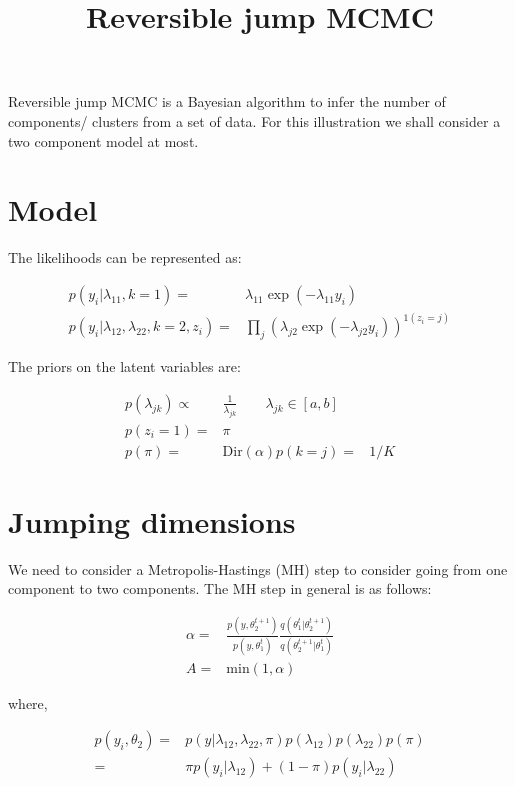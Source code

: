 \documentclass{article}
\title{Reversible jump MCMC}
\date{}
\begin{document}
\maketitle




Reversible jump MCMC is a Bayesian algorithm to infer the number of components/ clusters from a set of data. For this illustration we shall consider a two component model at most.

\section{Model}
The likelihoods can be represented as:

\begin{align}
p(y_i|\lambda_{11},k=1)=&\lambda_{11}\exp(-\lambda_{11}y_i)\\
p(y_i|\lambda_{12},\lambda_{22},k=2,z_i)=&\prod_j (\lambda_{j2}\exp(-\lambda_{j2}y_i))^{1(z_i=j)}
\end{align}


The priors on the latent variables are:


\begin{align}
p(\lambda_{jk})\propto & \frac{1}{\lambda_{jk}}\qquad \lambda_{jk}\in[a,b]\\
p(z_i=1)=&\pi\\
p(\pi) = & \text{Dir}(\alpha)
p(k=j)= & 1/K
\end{align}


\section{ Jumping dimensions}
We need to consider a Metropolis-Hastings (MH) step to consider going from one component to two components. The MH step in general is as follows:


\begin{align}
\alpha = & \frac{p(y,\theta_2^{t+1})}{p(y,\theta_1^t)}\frac{q(\theta_1^t|\theta_2^{t+1})}{q(\theta_2^{t+1}|\theta_1^{t})}\\
A = & \text{min}\left(1,\alpha\right)
\end{align}


where,


\begin{align}
p(y_i,\theta_2)=& p(y|\lambda_{12},\lambda_{22},\pi)p(\lambda_{12})p(\lambda_{22})p(\pi)\\
=&\pi p(y_i|\lambda_{12})+(1-\pi) p(y_i|\lambda_{22})
\end{align}
\end{document}
